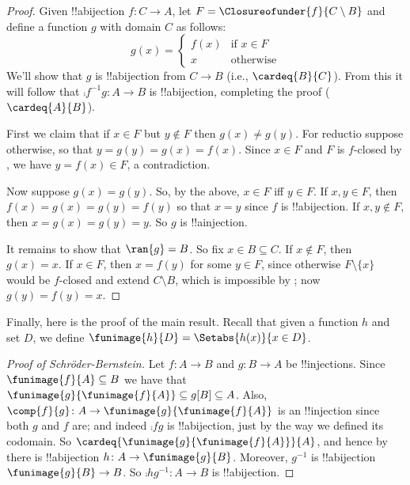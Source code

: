 \documentclass[../../../include/open-logic-section]{subfiles}
\begin{document}
\begin{proof}
Given !!a{bijection}  $f \colon C \to A$, let $F =
\Closureofunder{f}{C \setminus B}$ and define a function $g$ with
domain $C$ as follows:
\[
	g(x) = 
	\begin{cases}
			f(x) &\text{if $x \in F$}\\
			x & \text{otherwise}
		\end{cases}
\]
We'll show that $g$ is !!a{bijection} from $C \to B$ (i.e.,
$\cardeq{B}{C}$). From this it will follow that $\comp{f^{-1}}{g}
\colon A \to B$ is !!a{bijection}, completing the proof ($\cardeq{A}{B}$).

First we claim that if $x \in F$ but $y\notin F$ then $g(x) \neq
g(y)$. For reductio suppose otherwise, so that $y = g(y) = g(x) =
f(x)$. Since $x \in F$ and $F$ is $f$-closed by ,
we have $y = f(x) \in F$, a contradiction. 

Now suppose $g(x) = g(y)$. So, by the above, $x \in F$ iff $y \in F$.
If $x, y \in F$, then $f(x) = g (x) = g(y) = f(y)$ so that $x = y$
since $f$ is !!a{bijection}. If  $x, y \notin F$, then $x = g(x) =
g(y) = y$. So $g$ is !!a{injection}.

It remains to show that $\ran{g} = B$. So fix $x \in B \subseteq C$.
If $x \notin F$, then $g(x) = x$. If $x \in F$, then $x = f(y)$ for
some $y \in F$, since otherwise $F \setminus \{x\}$ would be $f$-closed and extend $C\setminus B$, which is impossible by ; now $g(y) = f(y) = x$.
\end{proof}

Finally, here is the proof of the main result. Recall that given a
function $h$ and set $D$, we define $\funimage{h}{D} = \Setabs{h(x)}{x
\in D}$. 

\begin{proof}[Proof of Schr\"oder-Bernstein] Let $f \colon A \to B$
and $g \colon B \to A$ be !!{injection}s. Since $\funimage{f}{A}
\subseteq B$ we have that $\funimage{g}{\funimage{f}{A}} \subseteq
g[B] \subseteq A$. Also, $\comp{f}{g} \colon A \to
\funimage{g}{\funimage{f}{A}}$ is an !!{injection} since both $g$ and
$f$ are; and indeed $\comp{f}{g}$ is !!a{bijection}, just by the way
we defined its codomain. So
$\cardeq{\funimage{g}{\funimage{f}{A}}}{A}$, and hence by
 there is !!a{bijection} $h \colon A \to
\funimage{g}{B}$. Moreover, $g^{-1}$ is !!a{bijection}
$\funimage{g}{B} \to B$. So $\comp{h}{g^{-1}} \colon A \to B$ is
!!a{bijection}. 
\end{proof}
\end{document}
